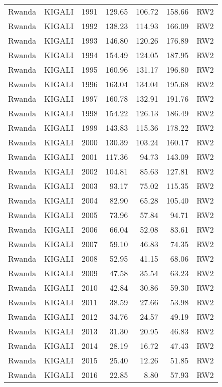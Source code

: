 \begin{longtable}{lllrrrl}
  Rwanda & KIGALI & 1991 & 129.65 & 106.72 & 158.66 & RW2 \\ 
  Rwanda & KIGALI & 1992 & 138.23 & 114.93 & 166.09 & RW2 \\ 
  Rwanda & KIGALI & 1993 & 146.80 & 120.26 & 176.89 & RW2 \\ 
  Rwanda & KIGALI & 1994 & 154.49 & 124.05 & 187.95 & RW2 \\ 
  Rwanda & KIGALI & 1995 & 160.96 & 131.17 & 196.80 & RW2 \\ 
  Rwanda & KIGALI & 1996 & 163.04 & 134.04 & 195.68 & RW2 \\ 
  Rwanda & KIGALI & 1997 & 160.78 & 132.91 & 191.76 & RW2 \\ 
  Rwanda & KIGALI & 1998 & 154.22 & 126.13 & 186.49 & RW2 \\ 
  Rwanda & KIGALI & 1999 & 143.83 & 115.36 & 178.22 & RW2 \\ 
  Rwanda & KIGALI & 2000 & 130.39 & 103.24 & 160.17 & RW2 \\ 
  Rwanda & KIGALI & 2001 & 117.36 & 94.73 & 143.09 & RW2 \\ 
  Rwanda & KIGALI & 2002 & 104.81 & 85.63 & 127.81 & RW2 \\ 
  Rwanda & KIGALI & 2003 & 93.17 & 75.02 & 115.35 & RW2 \\ 
  Rwanda & KIGALI & 2004 & 82.90 & 65.28 & 105.40 & RW2 \\ 
  Rwanda & KIGALI & 2005 & 73.96 & 57.84 & 94.71 & RW2 \\ 
  Rwanda & KIGALI & 2006 & 66.04 & 52.08 & 83.61 & RW2 \\ 
  Rwanda & KIGALI & 2007 & 59.10 & 46.83 & 74.35 & RW2 \\ 
  Rwanda & KIGALI & 2008 & 52.95 & 41.15 & 68.06 & RW2 \\ 
  Rwanda & KIGALI & 2009 & 47.58 & 35.54 & 63.23 & RW2 \\ 
  Rwanda & KIGALI & 2010 & 42.84 & 30.86 & 59.30 & RW2 \\ 
  Rwanda & KIGALI & 2011 & 38.59 & 27.66 & 53.98 & RW2 \\ 
  Rwanda & KIGALI & 2012 & 34.76 & 24.57 & 49.19 & RW2 \\ 
  Rwanda & KIGALI & 2013 & 31.30 & 20.95 & 46.83 & RW2 \\ 
  Rwanda & KIGALI & 2014 & 28.19 & 16.72 & 47.43 & RW2 \\ 
  Rwanda & KIGALI & 2015 & 25.40 & 12.26 & 51.85 & RW2 \\ 
  Rwanda & KIGALI & 2016 & 22.85 & 8.80 & 57.93 & RW2 \\ 

\end{longtable}
